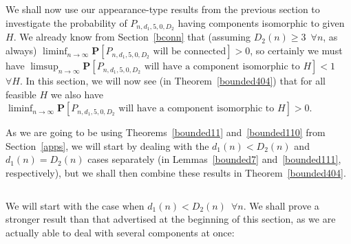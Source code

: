 \documentclass{article}
\newtheorem{Proof of Theorem}{Proof of Theorem}
\begin{document}
We shall now use our appearance-type results from the previous section 
to investigate the probability of $P_{n,d_{1},5,0,D_{2}}$ having components isomorphic to given~$H$.
We already know from Section~\ref{bconn} that
(assuming $D_{2}(n) \geq 3$~$\forall n$, as always)
$\liminf_{n \to \infty} \mathbf{P}[P_{n,d_{1},5,0,D_{2}} \textrm{ will be connected}] >0$, 
so certainly we must have
$\limsup_{n \to \infty} \mathbf{P}[P_{n,d_{1},5,0,D_{2}} \textrm{ will have a component isomorphic to $H$}] <1$~$\forall H$.
In this section,
we will now see (in Theorem~\ref{bounded404}) that for all feasible $H$ we also have 
$\liminf_{n \to \infty} \mathbf{P}[P_{n,d_{1},5,0,D_{2}} \textrm{ will have a component isomorphic to $H$}] >0$.

As we are going to be using Theorems~\ref{bounded11} and~\ref{bounded110} from Section~\ref{apps},
we will start by dealing with the $d_{1}(n) < D_{2}(n)$ and $d_{1}(n)=D_{2}(n)$ cases separately
(in Lemmas~\ref{bounded7} and~\ref{bounded111}, respectively),
but we shall then combine these results in Theorem~\ref{bounded404}. \\





\begin{figure}[omitted: a diagram of this paper's results, not reproduced here]\end{figure}





\begin{displaymath}
\end{displaymath} 

We will start with the case when $d_{1}(n) < D_{2}(n)$~$\forall n$.
We shall prove a stronger result than that advertised at the beginning of this section,
as we are actually able to deal with several components at once:
\end{document}
